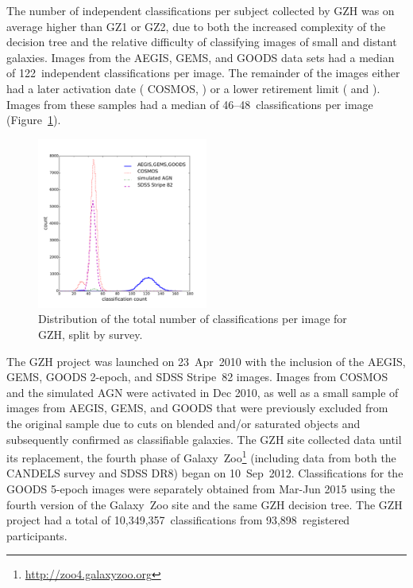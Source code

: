 \documentclass[a4paper,fleqn,usenatbib]{mnras}
\begin{document}
The number of independent classifications per subject collected by GZH was on
average higher than GZ1 or GZ2, due to both the increased complexity of the
decision tree and the relative difficulty of classifying images of small and
distant galaxies. Images from the \main{} AEGIS, GEMS, and GOODS data sets had
a median of 122~independent classifications per image. The remainder of the
images either had a later activation date (\main{} COSMOS, \simagn) or a lower
retirement limit (\stripe{} and \coadd). Images from these samples had a median
of 46--48~classifications per image (Figure~\ref{fig:classification_hist}).

\begin{figure}
\center
\includegraphics[width=0.5\textwidth]{figures/classification_hist.pdf}
\caption{Distribution of the total number of classifications per image for GZH,
split by survey.}
\label{fig:classification_hist}
\end{figure}

The GZH project was launched on 23~Apr~2010 with the inclusion of the AEGIS,
GEMS, GOODS 2-epoch, and SDSS Stripe~82 images. Images from COSMOS and the
simulated AGN were activated in Dec 2010, as well as a small sample of images
from AEGIS, GEMS, and GOODS that were previously excluded from the original
sample due to cuts on blended and/or saturated objects and subsequently
confirmed as classifiable galaxies. The GZH site collected data until its
replacement, the fourth phase of
Galaxy~Zoo\footnote{\url{http://zoo4.galaxyzoo.org}} (including data from both
the \hst{} CANDELS survey and SDSS DR8) began on 10~Sep~2012. Classifications
for the GOODS 5-epoch images were separately obtained from Mar-Jun 2015 using
the fourth version of the Galaxy~Zoo site and the same GZH decision tree.
The GZH project had a total of 10,349,357~classifications from
93,898~registered participants. 
\end{document}
